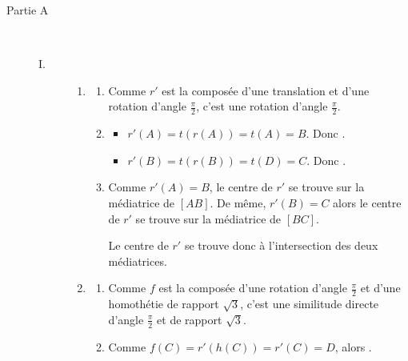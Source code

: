 \begin{description}
   \item[Partie A]~\newline
      \begin{description}
         \item[I. ]
            \begin{enumerate}
               \item \begin{enumerate}
									\item {}
										Comme $r'$ est la compos\'ee d'une translation et d'une rotation d'angle
										$\frac{\pi}{2}$, c'est une rotation d'angle $\frac{\pi}{2}$.
                        \item {}
									\begin{itemize}
										\item $r'(A) = t \left( r(A) \right) = t(A) = B$.
											Donc .
										\item $r'(B) = t \left( r(B) \right) = t(D) = C$.
											Donc .
									\end{itemize}
								\item {}
									Comme $r'(A) = B$,
									le centre de $r'$ se trouve sur la m\'ediatrice de $[AB]$.
									De m\^eme, $r'(B) = C$ alors le centre de $r'$ se trouve 
									sur la m\'ediatrice de $[BC]$.
									
										Le centre de $r'$ se trouve donc \`a l'intersection des deux m\'ediatrices.
										\par\noindent{}
							\end{enumerate}
					\item \begin{enumerate}
									\item {}
										Comme $f$ est la compos\'ee d'une rotation d'angle $\frac{\pi}{2}$
										et d'une homoth\'etie de rapport $\sqrt{3}$, c'est une similitude directe
										d'angle $\frac{\pi}{2}$ et de rapport $\sqrt{3}$.
								\item {}
										Comme
										$f(C) = r' \left( h(C) \right) = r' (C) = D$, 
										alors .
										

\end{enumerate}
\end{enumerate}
\end{description}
\end{description}

